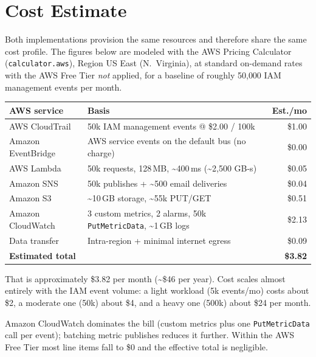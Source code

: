 \documentclass[11pt,a4paper]{report}
\begin{document}
\section{Cost Estimate}

Both implementations provision the same resources and therefore share the same
cost profile. The figures below are modeled with the AWS Pricing Calculator
(\texttt{calculator.aws}), Region US East (N.\ Virginia), at standard on-demand
rates with the AWS Free Tier \emph{not} applied, for a baseline of roughly
50{,}000 IAM management events per month.

\begin{center}
\renewcommand{\arraystretch}{1.3}
{\small
\begin{tabularx}{\linewidth}{l X r}
\toprule
\textbf{AWS service} & \textbf{Basis} & \textbf{Est./mo} \\
\midrule
AWS CloudTrail & 50k IAM management events @ \$2.00 / 100k & \$1.00 \\
Amazon EventBridge & AWS service events on the default bus (no charge) & \$0.00 \\
AWS Lambda & 50k requests, 128\,MB, \textasciitilde{}400\,ms (\textasciitilde{}2{,}500 GB-s) & \$0.05 \\
Amazon SNS & 50k publishes + \textasciitilde{}500 email deliveries & \$0.04 \\
Amazon S3 & \textasciitilde{}10\,GB storage, \textasciitilde{}55k PUT/GET & \$0.51 \\
Amazon CloudWatch & 3 custom metrics, 2 alarms, 50k \texttt{PutMetricData}, \textasciitilde{}1\,GB logs & \$2.13 \\
Data transfer & Intra-region + minimal internet egress & \$0.09 \\
\midrule
\textbf{Estimated total} & & \textbf{\$3.82} \\
\bottomrule
\end{tabularx}
}
\end{center}

That is approximately \$3.82 per month (\textasciitilde{}\$46 per year). Cost
scales almost entirely with the IAM event volume: a light workload
(5k events/mo) costs about \$2, a moderate one (50k) about \$4, and a heavy one
(500k) about \$24 per month.

\begin{notebox}[Note]
Amazon CloudWatch dominates the bill (custom metrics plus one
\texttt{PutMetricData} call per event); batching metric publishes reduces it
further. Within the AWS Free Tier most line items fall to \$0 and the effective
total is negligible.
\end{notebox}
\end{document}
